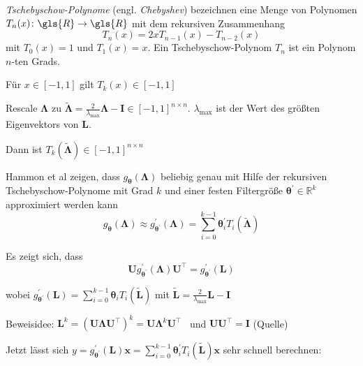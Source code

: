 \emph{Tschebyschow-Polynome} (engl. \emph{Chebyshev}) bezeichnen eine Menge von Polynomen $T_n\left(x\right) \colon \gls{R} \to \gls{R}$ mit dem rekursiven Zusammenhang
\begin{equation}
  T_n\left(x\right) = 2x T_{n-1}\left(x\right) - T_{n-2}\left(x\right)
\end{equation}
mit $T_0\left(x\right) = 1$ und $T_1\left(x\right) = x$.
Ein Tschebyschow-Polynom $T_n$ ist ein Polynom $n$-ten Grads.

Für $x \in \left[-1, 1\right]$ gilt $T_k\left(x\right) \in \left[-1, 1\right]$

Rescale $\mathbf{\Lambda}$ zu $\mathbf{\tilde \Lambda} = \frac{2}{\lambda_{\max}} \mathbf{\Lambda} - \mathbf{I} \in {\left[-1, 1\right]}^{n \times n}$.
$\lambda_{\max}$ ist der Wert des größten Eigenvektors von $\mathbf{L}$.

Dann ist $T_k\left(\mathbf{\tilde \Lambda}\right) \in {\left[-1, 1\right]}^{n \times n}$

Hammon et al zeigen, dass $g_{\mathbf{\theta}}(\mathbf{\Lambda})$ beliebig genau mit Hilfe der  rekursiven Tschebyschow-Polynome mit Grad $k$ und einer festen Filtergröße $\mathbf{\theta}^{\prime} \in \mathbb{R}^k$ approximiert werden kann
\begin{equation}
  g_{\mathbf{\theta}}\left(\mathbf{\Lambda}\right) \approx g^{\prime}_{\mathbf{\theta}^{\prime}}\left(\mathbf{\Lambda}\right) = \sum_{i = 0}^{k-1} \mathbf{\theta}^{\prime}_i T_i \left(\mathbf{\tilde \Lambda}\right)
\end{equation}


Es zeigt sich, dass
\begin{equation}
  \mathbf{U} g^{\prime}_{\mathbf{\theta}^{\prime}}\left(\mathbf{\Lambda}\right) \mathbf{U}^{\top} = g^{\prime}_{\mathbf{\theta}^{\prime}}\left(\mathbf{L}\right)
\end{equation}

wobei $g^{\prime}_{\mathbf{\theta}^{\prime}}\left(\mathbf{L}\right) = \sum_{i=0}^{k-1} \mathbf{\theta}_i T_i\left(\mathbf{\tilde L}\right)$ mit $\mathbf{\tilde L} = \frac{2}{\lambda_{\max}}\mathbf{L} - \mathbf{I}$

Beweisidee: $\mathbf{L}^k = {\left(\mathbf{U}\mathbf{\Lambda}\mathbf{U}^{\top}\right)}^k = \mathbf{U}\mathbf{\Lambda}^k\mathbf{U^{\top}}$~\cite{GCN} und $\mathbf{U}\mathbf{U}^{\top} = \mathbf{I}$ (Quelle)

Jetzt lässt sich $y = g^{\prime}_{\mathbf{\theta^{\prime}}}\left(\mathbf{L}\right) \mathbf{x} = \sum_{i=0}^{k-1} \mathbf{\theta}^{\prime}_i T_i \left(\mathbf{\tilde L}\right) \mathbf{x}$ sehr schnell berechnen:

